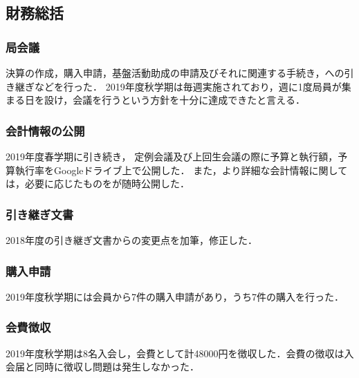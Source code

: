 \subsection*{財務総括}

\subsubsection*{局会議}
決算の作成，購入申請，基盤活動助成の申請及びそれに関連する手続き，\firstGrade{}への引き継ぎなどを行った．
2019年度秋学期は毎週実施されており，週に1度局員が集まる日を設け，会議を行うという方針を十分に達成できたと言える．

\subsubsection*{会計情報の公開}
2019年度春学期に引き続き， 定例会議及び上回生会議の際に予算と執行額，予算執行率をGoogleドライブ上で公開した．
また，より詳細な会計情報に関しては，必要に応じたものを\kaikeiStaff{}が随時公開した．

\subsubsection*{引き継ぎ文書}
2018年度の引き継ぎ文書からの変更点を加筆，修正した．

\subsubsection*{購入申請}
2019年度秋学期には会員から7件の購入申請があり，うち7件の購入を行った．

\subsubsection*{会費徴収}
2019年度秋学期は8名入会し，会費として計48000円を徴収した．会費の徴収は入会届と同時に徴収し問題は発生しなかった．
